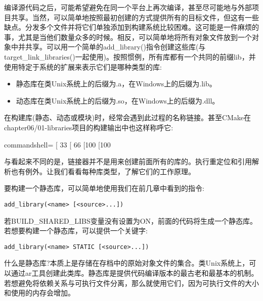 
编译源代码之后，可能希望避免在同一个平台上再次编译，甚至尽可能地与外部项目共享。当然，可以简单地按照最初创建的方式提供所有的目标文件，但这有一些缺点。分发多个文件并将它们单独添加到构建系统比较困难。这可能是一件麻烦的事，尤其是当他们数量众多的时候。相反，可以简单地将所有对象文件放到一个对象中并共享。可以用一个简单的add\_library()指令创建这些库(与target\_link\_libraries()一起使用)。按照惯例，所有库都有一个共同的前缀lib，并使用特定于系统的扩展来表示它们是哪种类型的库:

\begin{itemize}
\item 
静态库在类Unix系统上的后缀为.a，在Windows上的后缀为.lib。

\item 
动态库在类Unix系统上的后缀为.so，在Windows上的后缀为.dll。
\end{itemize}

在构建库(静态、动态或模块)时，经常会遇到此过程的名称链接。甚至CMake在chapter06/01-libraries项目的构建输出中也这样称呼它:

\begin{tcblisting}{commandshell={}}
[ 33%
[ 66%
[100%
[100%
\end{tcblisting}

与看起来不同的是，链接器并不是用来创建前面所有的库的。执行重定位和引用解析也有例外。让我们看看每种库类型，了解它们的工作原理。


要构建一个静态库，可以简单地使用我们在前几章中看到的指令:

\begin{lstlisting}[style=styleCMake]
add_library(<name> [<source>...])
\end{lstlisting}

若BUILD\_SHARED\_LIBS变量没有设置为ON，前面的代码将生成一个静态库。若想要构建一个静态库，可以提供一个关键字:

\begin{lstlisting}[style=styleCMake]
add_library(<name> STATIC [<source>...])
\end{lstlisting}

什么是静态库?本质上是存储在存档中的原始对象文件的集合。类Unix系统上，可以通过ar工具创建此类库。静态库是提供代码编译版本的最古老和最基本的机制。若想避免将依赖关系与可执行文件分离，那么就使用它们，因为可执行文件的大小和使用的内存会增加。

